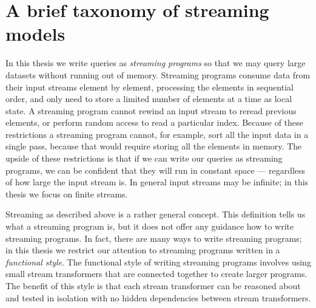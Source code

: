 \chapter{A brief taxonomy of streaming models}
\label{taxonomy}

In this thesis we write queries as \emph{streaming programs} so that we may query large datasets without running out of memory.
Streaming programs consume data from their input streams element by element, processing the elements in sequential order, and only need to store a limited number of elements at a time as local state.
A streaming program cannot rewind an input stream to reread previous elements, or perform random access to read a particular index.
Because of these restrictions a streaming program cannot, for example, sort all the input data in a single pass, because that would require storing all the elements in memory.
The upside of these restrictions is that if we can write our queries as streaming programs, we can be confident that they will run in constant space --- regardless of how large the input stream is.
In general input streams may be infinite; in this thesis we focus on finite streams.


Streaming as described above is a rather general concept.
This definition tells us what a streaming program is, but it does not offer any guidance how to write streaming programs.
In fact, there are many ways to write streaming programs; in this thesis we restrict our attention to streaming programs written in a \emph{functional style}.
The functional style of writing streaming programs involves using small stream transformers that are connected together to create larger programs.
The benefit of this style is that each stream transformer can be reasoned about and tested in isolation with no hidden dependencies between stream transformers.

